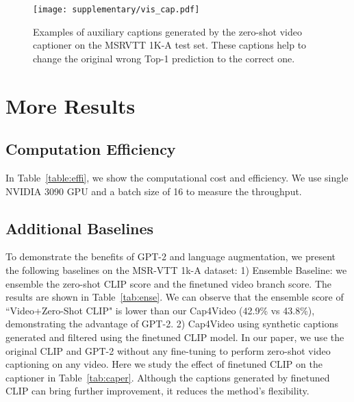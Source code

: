 \documentclass[10pt,twocolumn,letterpaper]{article}
\begin{document}
\begin{figure*}
\centering
  \texttt{[image: supplementary/vis\_cap.pdf]} 
  \caption{Examples of auxiliary captions generated by the zero-shot video captioner on the MSRVTT 1K-A test set. These captions help to change the original wrong Top-1 prediction to the correct one.}
  \label{fig:cap}
\end{figure*}


\section{More Results}\label{supp:video}

\subsection{Computation Efficiency}\label{sec:com_eff}
In Table~\ref{table:effi}, we show the computational cost and efficiency. We use single NVIDIA 3090 GPU and a batch size of 16 to measure the throughput.


\begin{table}[t]
\centering
{}
\vspace{-1mm}
\caption{Computation efficiency. ``vid/s" represents the average number of videos per second. Model: ViT-B/32.}
\label{table:effi}
\end{table}


\subsection{Additional Baselines}\label{sec:cap_agg}
To demonstrate the benefits of GPT-2 and language augmentation, we present the following baselines on the MSR-VTT 1k-A dataset:
1) Ensemble Baseline: we ensemble the zero-shot CLIP score and the finetuned video branch score. The results are shown in Table~\ref{tab:ense}. We can observe that the ensemble score of ``Video+Zero-Shot CLIP" is lower than our Cap4Video (42.9\% vs 43.8\%), demonstrating the advantage of GPT-2.
2) Cap4Video using synthetic captions generated and filtered using the finetuned CLIP model. In our paper, we use the original CLIP and GPT-2 without any fine-tuning to perform zero-shot video captioning on any video. Here we study the effect of finetuned CLIP on the captioner in Table~\ref{tab:caper}. Although the captions generated by finetuned CLIP can bring further improvement, it reduces the method's flexibility.
\end{document}
